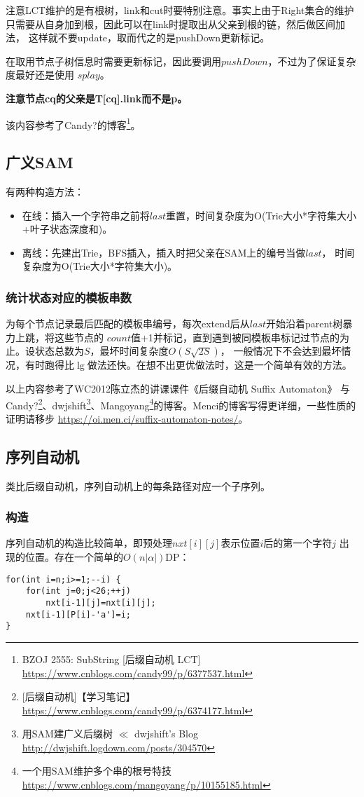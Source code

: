 注意LCT维护的是有根树，link和cut时要特别注意。事实上由于Right集合的维护
只需要从自身加到根，因此可以在link时提取出从父亲到根的链，然后做区间加法，
这样就不要update，取而代之的是pushDown更新标记。

在取用节点子树信息时需要更新标记，因此要调用$pushDown$，不过为了保证复杂度最好还是使用
$splay$。

{\bfseries 注意节点cq的父亲是T[cq].link而不是p。}

该内容参考了Candy?的博客\footnote{
    BZOJ 2555: SubString [后缀自动机 LCT]
    \url{https://www.cnblogs.com/candy99/p/6377537.html}
}。
\subsection{广义SAM}
有两种构造方法：
\begin{itemize}
    \item 在线：插入一个字符串之前将$last$重置，时间复杂度为O(Trie大小*字符集大小
    +叶子状态深度和)。
    \item 离线：先建出Trie，BFS插入，插入时把父亲在SAM上的编号当做$last$，
    时间复杂度为O(Trie大小*字符集大小)。
\end{itemize}

\subsubsection{统计状态对应的模板串数}
为每个节点记录最后匹配的模板串编号，每次extend后从$last$开始沿着parent树暴力上跳，将这些节点的
$count$值+1并标记，直到遇到被同模板串标记过节点的为止。设状态总数为$S$，最坏时间复杂度$O(S\sqrt{2S})$，
一般情况下不会达到最坏情况，有时跑得比$\lg$做法还快。在想不出更优做法时，这是一个简单有效的方法。

以上内容参考了WC2012陈立杰的讲课课件《后缀自动机 Suffix Automaton》
与Candy?\footnote{[后缀自动机]【学习笔记】
    \url{https://www.cnblogs.com/candy99/p/6374177.html}
}、dwjshift\footnote{
    用SAM建广义后缀树 $\ll$ dwjshift's Blog
    \url{http://dwjshift.logdown.com/posts/304570}
}、Mangoyang\footnote{
    一个用SAM维护多个串的根号特技
    \url{https://www.cnblogs.com/mangoyang/p/10155185.html}
}的博客。Menci的博客写得更详细，一些性质的证明请移步
\url{https://oi.men.ci/suffix-automaton-notes/}。
\subsection{序列自动机}
类比后缀自动机，序列自动机上的每条路径对应一个子序列。

\subsubsection{构造}
序列自动机的构造比较简单，即预处理$nxt[i][j]$表示位置$i$后的第一个字符$j$
出现的位置。存在一个简单的$O(n|\alpha|)$DP：
\begin{lstlisting}
for(int i=n;i>=1;--i) {
    for(int j=0;j<26;++j)
        nxt[i-1][j]=nxt[i][j];
    nxt[i-1][P[i]-'a']=i;
}
\end{lstlisting}

